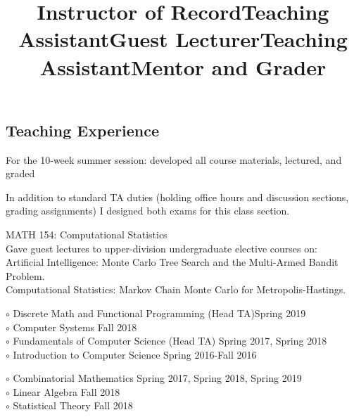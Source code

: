 \documentclass[margin]{res}
\begin{document}
\begin{resume}
\section{Teaching Experience}
\title{\textbf{Instructor of Record}}
\begin{position}
	For the 10-week summer session: developed all course materials, lectured, and graded
\end{position}

\title{\textbf{Teaching Assistant}}
\begin{position}
	In addition to standard TA duties (holding office hours and discussion sections, grading assignments) I designed both exams for this class section. 
\end{position}

\title{\textbf{Guest Lecturer}}
\begin{position}
MATH 154: Computational Statistics\\
Gave guest lectures to upper-division undergraduate elective courses on:\\
Artificial Intelligence: Monte Carlo Tree Search and the Multi-Armed Bandit Problem.\\
Computational Statistics: Markov Chain Monte Carlo for Metropolis-Hastings.
\end{position}

\dates{}
\title{\textbf{Teaching Assistant}}
\begin{position}
$\circ$ Discrete Math and Functional Programming (Head TA)\hfill Spring 2019\\
$\circ$ Computer Systems \hfill Fall 2018\\
$\circ$ Fundamentals of Computer Science (Head TA) \hfill Spring 2017, Spring 2018\\
$\circ$ Introduction to Computer Science \hfill Spring 2016-Fall 2016

\end{position}

\dates{}
\title{\textbf{Mentor and Grader}}
\begin{position}
$\circ$ Combinatorial Mathematics \hfill Spring 2017, Spring 2018, Spring 2019\\
$\circ$ Linear Algebra \hfill Fall 2018\\
$\circ$ Statistical Theory \hfill Fall 2018


\end{position}
\end{resume}
\end{document}
